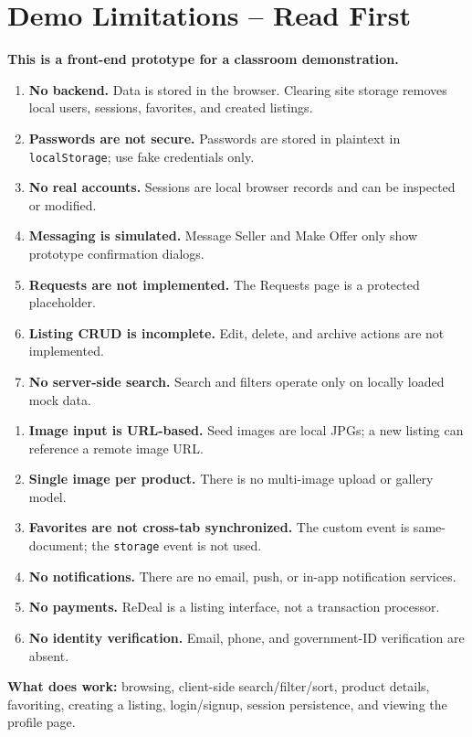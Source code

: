 \documentclass[10pt]{article}
\newcommand{\code}[1]{\texttt{#1}}
\begin{document}
\section{Demo Limitations -- Read First}
\begin{limitbox}
\small
\textbf{This is a front-end prototype for a classroom demonstration.}

\begin{minipage}[t]{0.48\linewidth}
\begin{enumerate}
  \setlength{\itemsep}{1pt}
  \item \textbf{No backend.} Data is stored in the browser. Clearing site storage removes local users, sessions, favorites, and created listings.
  \item \textbf{Passwords are not secure.} Passwords are stored in plaintext in \code{localStorage}; use fake credentials only.
  \item \textbf{No real accounts.} Sessions are local browser records and can be inspected or modified.
  \item \textbf{Messaging is simulated.} Message Seller and Make Offer only show prototype confirmation dialogs.
  \item \textbf{Requests are not implemented.} The Requests page is a protected placeholder.
  \item \textbf{Listing CRUD is incomplete.} Edit, delete, and archive actions are not implemented.
  \item \textbf{No server-side search.} Search and filters operate only on locally loaded mock data.
\end{enumerate}
\end{minipage}
\hfill
\begin{minipage}[t]{0.48\linewidth}
\begin{enumerate}
  \setlength{\itemsep}{1pt}
  \setcounter{enumi}{7}
  \item \textbf{Image input is URL-based.} Seed images are local JPGs; a new listing can reference a remote image URL.
  \item \textbf{Single image per product.} There is no multi-image upload or gallery model.
  \item \textbf{Favorites are not cross-tab synchronized.} The custom event is same-document; the \code{storage} event is not used.
  \item \textbf{No notifications.} There are no email, push, or in-app notification services.
  \item \textbf{No payments.} ReDeal is a listing interface, not a transaction processor.
  \item \textbf{No identity verification.} Email, phone, and government-ID verification are absent.
\end{enumerate}
\end{minipage}

\textbf{What does work:} browsing, client-side search/filter/sort, product details, favoriting, creating a listing, login/signup, session persistence, and viewing the profile page.
\end{limitbox}
\end{document}
